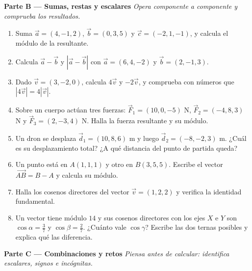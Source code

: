 \documentclass[12pt, letterpaper]{article}
\begin{document}
\medskip
\noindent\textbf{Parte B --- Sumas, restas y escalares \medio}\quad \emph{Opera componente a componente y comprueba los resultados.}

\begin{enumerate}[leftmargin=*, resume]
  \item \medio{} Suma $\vec{a} = (4, -1, 2)$, $\vec{b} = (0, 3, 5)$ y $\vec{c} = (-2, 1, -1)$, y calcula el módulo de la resultante.

  \item \medio{} Calcula $\vec{a} - \vec{b}$ y $|\vec{a} - \vec{b}|$ con $\vec{a} = (6, 4, -2)$ y $\vec{b} = (2, -1, 3)$.

  \item \medio{} Dado $\vec{v} = (3, -2, 0)$, calcula $4\vec{v}$ y $-2\vec{v}$, y comprueba con números que $|4\vec{v}| = 4|\vec{v}|$.

  \item \medio{} Sobre un cuerpo actúan tres fuerzas: $\vec{F}_1 = (10, 0, -5)$ N, $\vec{F}_2 = (-4, 8, 3)$ N y $\vec{F}_3 = (2, -3, 4)$ N. Halla la fuerza resultante y su módulo.

  \item \medio{} Un dron se desplaza $\vec{d}_1 = (10, 8, 6)$ m y luego $\vec{d}_2 = (-8, -2, 3)$ m. ¿Cuál es su desplazamiento total? ¿A qué distancia del punto de partida queda?

  \item \medio{} Un punto está en $A(1, 1, 1)$ y otro en $B(3, 5, 5)$. Escribe el vector $\overrightarrow{AB} = B - A$ y calcula su módulo.

  \item \medio{} Halla los cosenos directores del vector $\vec{v} = (1, 2, 2)$ y verifica la identidad fundamental.

  \item \medio{} Un vector tiene módulo $14$ y sus cosenos directores con los ejes $X$ e $Y$ son $\cos\alpha = \tfrac{3}{7}$ y $\cos\beta = \tfrac{2}{7}$. ¿Cuánto vale $\cos\gamma$? Escribe las dos ternas posibles y explica qué las diferencia.
\end{enumerate}

\medskip
\noindent\textbf{Parte C --- Combinaciones y retos \dificil}\quad \emph{Piensa antes de calcular: identifica escalares, signos e incógnitas.}
\end{document}
